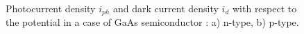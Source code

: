 \begin{figure}[h]
    \centering
    
    \caption{Photocurrent density $i_{ph}$ and dark current density 
    $i_d$ with respect to the potential in a case of GaAs semiconductor 
    \citep{plieth2008-1}: a) n-type, b) p-type.}
    \label{fig_photocurrent_plieth}
\end{figure}